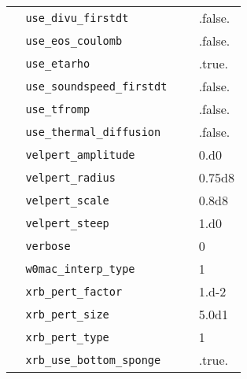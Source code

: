 {\begin{center}
\begin{longtable}{|l|p{3.25in}|l|}
\verb=  use_divu_firstdt =  &   &  .false. \\
\verb=  use_eos_coulomb =  &   &  .false. \\
\verb=  use_etarho =  &   &  .true. \\
\verb=  use_soundspeed_firstdt =  &   &  .false. \\
\verb=  use_tfromp =  &   &  .false. \\
\verb=  use_thermal_diffusion =  &   &  .false. \\
\verb=  velpert_amplitude =  &   &  0.d0 \\
\verb=  velpert_radius =  &   &  0.75d8 \\
\verb=  velpert_scale =  &   &  0.8d8 \\
\verb=  velpert_steep =  &   &  1.d0 \\
\verb=  verbose =  &   &  0 \\
\verb=  w0mac_interp_type =  &   &  1 \\
\verb=  xrb_pert_factor =  &   &  1.d-2 \\
\verb=  xrb_pert_size =  &   &  5.0d1 \\
\verb=  xrb_pert_type =  &   &  1 \\
\verb=  xrb_use_bottom_sponge =  &   &  .true. \\

\end{longtable}
\end{center}

} %

%

